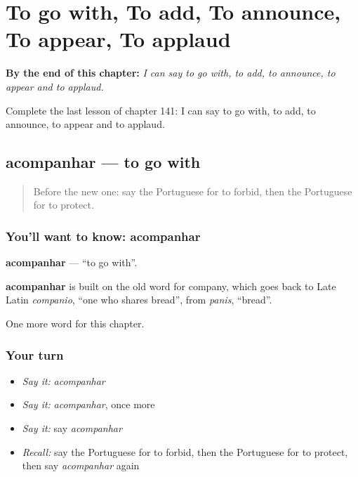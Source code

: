 
\chapter{To go with, To add, To announce, To appear, To applaud}
\label{ch:pt-to-go-with-to-add-to-announce-to-appear-to-applaud}

\begin{chapteropening}
\textbf{By the end of this chapter:} \emph{I can say to go with, to add, to announce, to appear and to applaud.}

Complete the last lesson of chapter 141: I can say to go with, to add, to announce, to appear and to applaud.
\end{chapteropening}

\section[acompanhar]{acompanhar — to go with}

\label{lesson:PT-C141-acompanhar}



\begin{quote}
Before the new one: say the Portuguese for to forbid, then the Portuguese for to protect.
\end{quote}

\subsection*{You'll want to know: acompanhar}
\textbf{acompanhar} — \textquotedblleft{}to go with\textquotedblright{}.

\begin{cousinweb}
\textbf{acompanhar} is built on the old word for company, which goes back to Late Latin \emph{companio}, \textquotedblleft{}one who shares bread\textquotedblright{}, from \emph{panis}, \textquotedblleft{}bread\textquotedblright{}.
\end{cousinweb}

\begin{grammarlens}[title={What you've built}]
One more word for this chapter.
\end{grammarlens}

\subsection*{Your turn}
\begin{itemize}
\raggedright
  \item \emph{Say it:} \emph{acompanhar}
  \item \emph{Say it:} \emph{acompanhar}, once more
  \item \emph{Say it:} say \emph{acompanhar}
  \item \emph{Recall:} say the Portuguese for to forbid, then the Portuguese for to protect, then say \emph{acompanhar} again
\end{itemize}

